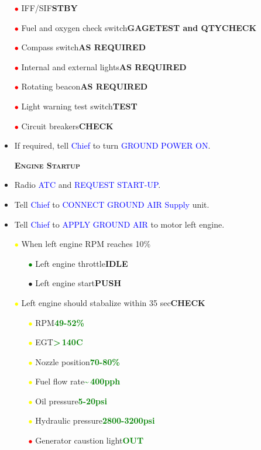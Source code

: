 \documentclass[a4paper,12pt,dvipsnames]{letter}
\newcommand{\radio}[1]{\textcolor{blue}{#1}}
\newcommand{\button}[1]{\textbf{#1}}
\newcommand{\degC}{\textdegree{}C}
\newcommand{\ok}[1]{\textcolor{Green}{\textbf{#1}}}
\newcommand{\myHead}[1]{{\LARGE\textsc{\textbf{#1}}}}
\newcommand{\bi}{\textcolor{ProcessBlue}{$\bullet$\;}}
\newcommand{\ri}{\textcolor{Red}{$\bullet$\;}}
\newcommand{\gi}{\textcolor{Green}{$\bullet$\;}}
\newcommand{\yi}{\textcolor{Yellow}{$\bullet$\;}}
\begin{document}
{\begin{itemize}
 \item[\ri] IFF/SIF\dotfill\button{STBY}
 \item[\ri] Fuel and oxygen check switch\dotfill\button{GAGE\;TEST and QTY\;CHECK}
 \item[\ri] Compass switch\dotfill\button{AS REQUIRED}
 \item[\ri] Internal and external lights\dotfill\button{AS REQUIRED}
 \item[\ri] Rotating beacon\dotfill\button{AS REQUIRED}
 \item[\ri] Light warning test switch\dotfill\button{TEST}
 \item[\ri] Circuit breakers\dotfill\button{CHECK}
 \item If required, tell \radio{Chief} to turn \radio{GROUND POWER ON}.
\end{itemize}
\newpage
\begin{itemize}
 \item[] \myHead{Engine Startup}
 \item Radio \radio{ATC} and \radio{REQUEST START-UP}.
 \item Tell \radio{Chief} to \radio{CONNECT GROUND AIR Supply} unit.
 \item Tell \radio{Chief} to \radio{APPLY GROUND AIR} to motor left engine.
 \item[\yi] When left engine RPM reaches 10\;\%
 \begin{itemize}
  \item[\gi] Left engine throttle\dotfill\button{IDLE}
  \item[\bi] Left engine start\dotfill\button{PUSH}
 \end{itemize}
 \item[\yi] Left engine should stabalize within 35 sec\dotfill\button{CHECK}
  \begin{itemize}
  \item[\yi] RPM\dotfill\ok{49-52\;\%}
  \item[\yi] EGT\dotfill\ok{>\,140\;\degC}
  \item[\yi] Nozzle position\dotfill\ok{70-80\;\%}
  \item[\yi] Fuel flow rate\dotfill\ok{\textasciitilde\,400\;pph}
  \item[\yi] Oil pressure\dotfill\ok{5-20\;psi}
  \item[\yi] Hydraulic pressure\dotfill\ok{2800-3200\;psi}
  \item[\ri] Generator caustion light\dotfill\ok{OUT}

\end{itemize}
\end{itemize}}
\end{document}
